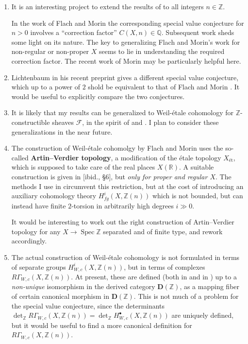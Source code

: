 \documentclass{article}
\DeclareMathOperator{\Spec}{Spec}
\newcommand{\ZZ}{\mathbb{Z}}
\newcommand{\QQ}{\mathbb{Q}}
\newcommand{\RR}{\mathbb{R}}
\begin{document}
\begin{enumerate}
\item It is an interesting project to extend the results of
  \cite{Weil-etale-1-dim} to all integers $n \in \ZZ$.

  In the work of Flach and Morin \cite{Flach-Morin-2018} the corresponding
  special value conjecture for $n > 0$ involves a ``correction factor''
  $C (X,n) \in \QQ$. Subsequent work
  \cite{Flach-Morin-2020,Flach-Morin-2020-Muenster} sheds some light on its
  nature. The key to generalizing Flach and Morin's work for non-regular or
  non-proper $X$ seems to lie in understanding the required correction
  factor. The recent work of Morin \cite{Morin-2021-THH} may be particularly
  helpful here.

\item Lichtenbaum in his recent preprint \cite{Lichtenbaum-2021} gives a
  different special value conjecture, which up to a power of $2$ shold be
  equivalent to that of Flach and Morin \cite{Flach-Morin-2018}. It would be
  useful to explicitly compare the two conjectures.

\item It is likely that my results can be generalized to Weil-étale cohomology
  for $\ZZ$-constructible sheaves $\mathcal{F}$, in the spirit of
  \cite{Geisser-Suzuki-2020} and \cite{Adrien-Morin-2021}. I plan to consider
  these generalizations in the near future.

\item The construction of Weil-étale cohomolgy by Flach and Morin
  \cite{Flach-Morin-2018} uses the so-called \textbf{Artin--Verdier topology},
  a modification of the étale topology $X_\text{\'et}$, which is supposed to take
  care of the real places $X (\RR)$. A suitable construction is given in
  [ibid., \S 6], but \emph{only for proper and regular $X$}. The methods I use
  in \cite{Weil-etale-cohomology} circumvent this restriction, but at the cost
  of introducing an auxiliary cohomology theory $H^i_{fg} (X, \ZZ(n))$ which is
  not bounded, but can instead have finite $2$-torsion in arbitrarily high
  degrees $i \gg 0$.

  It would be interesting to work out the right construction of Artin--Verdier
  topology for any $X \to \Spec \ZZ$ separated and of finite type, and rework
  \cite{Weil-etale-cohomology} accordingly.

\item The actual construction of Weil-étale cohomology is not formulated in
  terms of separate groups $H^i_{W,c} (X, \ZZ (n))$, but in terms of complexes
  $R\Gamma_{W,c} (X, \ZZ (n))$. At present, these are defined (both in
  \cite{Flach-Morin-2018} and in \cite{Weil-etale-cohomology}) up to a
  \emph{non-unique} isomorphism in the derived category $\mathbf{D} (\ZZ)$, as a
  mapping fiber of certain canonical morphism in $\mathbf{D} (\ZZ)$. This is not
  much of a problem for the special value conjecture, since the determinants
  $\det_\ZZ R\Gamma_{W,c} (X, \ZZ (n)) = \det_\ZZ H^\bullet_{W,c} (X, \ZZ(n))$
  are uniquely defined, but it would be useful to find a more canonical
  definition for $R\Gamma_{W,c} (X, \ZZ (n))$.


\end{enumerate}
\end{document}
